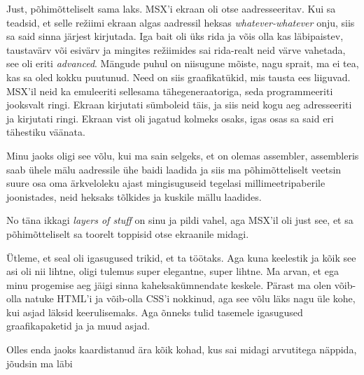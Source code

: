 Just, põhimõtteliselt sama laks. MSX'i ekraan oli otse aadresseeritav. Kui sa teadsid, et selle režiimi ekraan algas aadressil heksas \emph{whatever-whatever} onju, siis sa said sinna järjest kirjutada. Iga bait oli üks rida ja võis olla kas läbipaistev, taustavärv või esivärv ja mingites režiimides sai rida-realt neid värve vahetada, see oli eriti \emph{advanced}. Mängude puhul on niisugune mõiste, nagu sprait, ma ei tea, kas sa oled kokku puutunud. Need on siis graafikatükid, mis tausta ees liiguvad. MSX'il neid ka emuleeriti sellesama tähegeneraatoriga, seda programmeeriti jooksvalt ringi. Ekraan kirjutati sümboleid täis, ja siis neid kogu aeg adresseeriti ja kirjutati ringi. Ekraan vist oli jagatud kolmeks osaks, igas osas sa said eri tähestiku väänata.

Minu jaoks oligi see võlu, kui ma sain selgeks, et on olemas assembler, assembleris saab ühele mälu aadressile ühe baidi laadida ja siis ma põhimõtteliselt veetsin suure osa oma ärkveloleku ajast mingisuguseid tegelasi  millimeetripaberile joonistades, neid heksaks tõlkides ja kuskile mällu laadides. 


No täna ikkagi \emph{layers of stuff} on sinu ja pildi vahel, aga MSX'il oli just see, et sa põhimõtteliselt sa toorelt toppisid otse ekraanile midagi. 


Ütleme, et seal oli igasugused trikid, et ta töötaks. Aga kuna keelestik ja kõik see asi oli nii lihtne, oligi tulemus super elegantne, super  lihtne.  Ma arvan, et ega minu progemise aeg jäigi sinna kaheksakümnendate keskele. Pärast ma olen võib-olla natuke HTML'i ja võib-olla CSS'i nokkinud, aga see võlu läks nagu üle kohe, kui asjad läksid keerulisemaks. Aga õnneks tulid tasemele igasugused graafikapaketid ja ja muud asjad. 


Olles enda jaoks kaardistanud ära kõik kohad, kus sai midagi arvutitega näppida, jõudsin ma läbi

